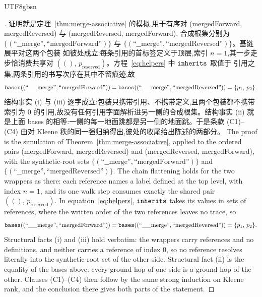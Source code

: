 \begin{CJK*}{UTF8}{gbsn}
\begin{proof}[]
\ifPaperChinese
  证明就是定理~\ref{thm:merge-associative} 的模拟,用于有序对
  (mergedForward, mergedReversed) 与 (mergedReversed, mergedForward),
  合成根集分别为 $\{(\text{``\_\_merge''}, \text{``mergedForward''})\}$ 与
  $\{(\text{``\_\_merge''}, \text{``mergedReversed''})\}$。基链展平对这两个包装
  如彼处成立:每条引用的首标签定义于顶层,索引 $n = 1$,其一步走步恰消费共享对
  $((),\, p_{\mathrm{reserved}})$。方程~\eqref{eq:helpers} 中 $\mathtt{inherits}$ 取值于
  引用之集,两条引用的书写次序在其中不留痕迹,故
  \[
    \mathtt{bases}((\text{``\_\_merge''}, \text{``mergedForward''})) =
    \mathtt{bases}((\text{``\_\_merge''}, \text{``mergedReversed''})) = \{p_1,\, p_2\}.
  \]
  结构事实 (i) 与 (iii) 逐字成立:包装只携带引用、不携带定义,且两个包装都不携带
  索引为 $0$ 的引用,故没有任何引用字面解析进另一侧的合成根集。结构事实 (ii)
  就是上面 bases 的相等:一侧的每一地面跳都是另一侧的地面跳。于是条款
  (C1)--(C4) 由对 Kleene 秩的同一强归纳得出,彼处的收尾给出陈述的两部分。
\else
  The proof is the simulation of Theorem~\ref{thm:merge-associative},
  applied to the ordered pairs (mergedForward, mergedReversed) and
  (mergedReversed, mergedForward), with the synthetic-root sets
  $\{(\text{``\_\_merge''}, \text{``mergedForward''})\}$ and
  $\{(\text{``\_\_merge''}, \text{``mergedReversed''})\}$. The chain
  flattening holds for the two wrappers as there: each reference names a
  label defined at the top level, with index $n = 1$, and its one walk
  step consumes exactly the shared pair $((),\, p_{\mathrm{reserved}})$.
  In equation~\eqref{eq:helpers}, $\mathtt{inherits}$ takes its values in sets of
  references, where the written order of the two references leaves no
  trace, so
  \[
    \mathtt{bases}((\text{``\_\_merge''}, \text{``mergedForward''})) =
    \mathtt{bases}((\text{``\_\_merge''}, \text{``mergedReversed''})) = \{p_1,\, p_2\}.
  \]
  Structural facts (i) and (iii) hold verbatim: the wrappers carry
  references and no definitions, and neither carries a reference of
  index $0$, so no reference resolves literally into the synthetic-root
  set of the other side. Structural fact (ii) is the equality of the
  bases above: every ground hop of one side is a ground hop of the
  other. Clauses (C1)--(C4) then follow by the same strong induction on
  Kleene rank, and the conclusion there gives both parts of the
  statement.
\fi
\end{proof}


\end{CJK*}
